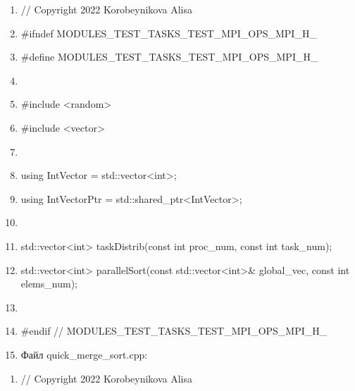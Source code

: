 \documentclass[]{article}
\begin{document}
\begin{enumerate}
\def\labelenumi{\arabic{enumi}.}
\setcounter{enumi}{1}
\item
  // Copyright 2022 Korobeynikova Alisa
\item
  \#ifndef MODULES\_TEST\_TASKS\_TEST\_MPI\_OPS\_MPI\_H\_
\item
  \#define MODULES\_TEST\_TASKS\_TEST\_MPI\_OPS\_MPI\_H\_
\item
\item
  \#include \textless{}random\textgreater{}
\item
  \#include \textless{}vector\textgreater{}
\item
\item
  using IntVector = std::vector\textless{}int\textgreater{};
\item
  using IntVectorPtr =
  std::shared\_ptr\textless{}IntVector\textgreater{};
\item
\item
  std::vector\textless{}int\textgreater{} taskDistrib(const int
  proc\_num, const int task\_num);
\item
  std::vector\textless{}int\textgreater{} parallelSort(const
  std::vector\textless{}int\textgreater{}\& global\_vec, const int
  elems\_num);
\item
\item
  \#endif // MODULES\_TEST\_TASKS\_TEST\_MPI\_OPS\_MPI\_H\_
\item
  Файл quick\_merge\_sort.cpp:
\end{enumerate}

\begin{enumerate}
\def\labelenumi{\arabic{enumi}.}
\item
  // Copyright 2022 Korobeynikova Alisa
\end{enumerate}
\end{document}
